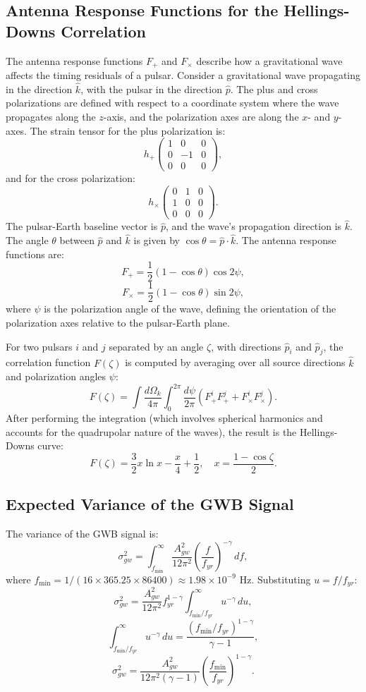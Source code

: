 \documentclass[11pt]{article}
\begin{document}
\subsection{Antenna Response Functions for the Hellings-Downs Correlation}
The antenna response functions $F_+$ and $F_\times$ describe how a gravitational wave affects the timing residuals of a pulsar. Consider a gravitational wave propagating in the direction $\hat{k}$, with the pulsar in the direction $\hat{p}$. The plus and cross polarizations are defined with respect to a coordinate system where the wave propagates along the $z$-axis, and the polarization axes are along the $x$- and $y$-axes. The strain tensor for the plus polarization is:
\[
h_+ \begin{pmatrix} 1 & 0 & 0 \\ 0 & -1 & 0 \\ 0 & 0 & 0 \end{pmatrix},
\]
and for the cross polarization:
\[
h_\times \begin{pmatrix} 0 & 1 & 0 \\ 1 & 0 & 0 \\ 0 & 0 & 0 \end{pmatrix}.
\]
The pulsar-Earth baseline vector is $\hat{p}$, and the wave’s propagation direction is $\hat{k}$. The angle $\theta$ between $\hat{p}$ and $\hat{k}$ is given by $\cos \theta = \hat{p} \cdot \hat{k}$. The antenna response functions are:
\[
F_+ = \frac{1}{2} (1 - \cos \theta) \cos 2\psi,
\]
\[
F_\times = \frac{1}{2} (1 - \cos \theta) \sin 2\psi,
\]
where $\psi$ is the polarization angle of the wave, defining the orientation of the polarization axes relative to the pulsar-Earth plane.

For two pulsars $i$ and $j$ separated by an angle $\zeta$, with directions $\hat{p}_i$ and $\hat{p}_j$, the correlation function $F(\zeta)$ is computed by averaging over all source directions $\hat{k}$ and polarization angles $\psi$:
\[
F(\zeta) = \int \frac{d\Omega_k}{4\pi} \int_0^{2\pi} \frac{d\psi}{2\pi} \left( F_+^i F_+^j + F_\times^i F_\times^j \right).
\]
After performing the integration (which involves spherical harmonics and accounts for the quadrupolar nature of the waves), the result is the Hellings-Downs curve:
\[
F(\zeta) = \frac{3}{2} x \ln x - \frac{x}{4} + \frac{1}{2}, \quad x = \frac{1 - \cos \zeta}{2}.
\]

\subsection{Expected Variance of the GWB Signal}
The variance of the GWB signal is:
\[
\sigma_{gw}^2 = \int_{f_{\text{min}}}^{\infty} \frac{A_{gw}^2}{12 \pi^2} \left( \frac{f}{f_{yr}} \right)^{-\gamma} \, df,
\]
where $f_{\text{min}} = 1/(16 \times 365.25 \times 86400) \approx 1.98 \times 10^{-9}$ Hz. Substituting $u = f / f_{yr}$:
\[
\sigma_{gw}^2 = \frac{A_{gw}^2}{12 \pi^2} f_{yr}^{1-\gamma} \int_{f_{\text{min}}/f_{yr}}^{\infty} u^{-\gamma} \, du,
\]
\[
\int_{f_{\text{min}}/f_{yr}}^{\infty} u^{-\gamma} \, du = \frac{(f_{\text{min}}/f_{yr})^{1-\gamma}}{\gamma-1},
\]
\[
\sigma_{gw}^2 = \frac{A_{gw}^2}{12 \pi^2 (\gamma-1)} \left( \frac{f_{\text{min}}}{f_{yr}} \right)^{1-\gamma}.
\]
\end{document}

